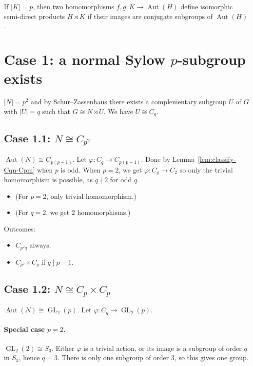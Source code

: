 \begin{lemma}
    \label{lem:conjugate-image-sdp}
    If $|K| = p$, then two homomorphisms $f, g : K \to \operatorname{Aut}(H)$
    define isomorphic semi-direct products $H \rtimes K$ if their images are
    conjugate subgroups of $\operatorname{Aut}(H)$.
\end{lemma}

\section{Case 1: a normal Sylow $p$-subgroup exists}

$|N| = p^2$ and by Schur--Zassenhaus there exists a complementary subgroup $U$
of $G$ with $|U| = q$ such that $G \cong N \rtimes U$. We have $U \cong C_q$.

\subsection{Case 1.1: $N \cong C_{p^2}$}

$\operatorname{Aut}(N) \cong C_{p(p-1)}$. Let
$\varphi : C_q \to C_{p(p-1)}$. Done by Lemma~\ref{lem:classify-Cqn-Cpm}
when $p$ is odd. When $p = 2$, we get $\varphi : C_q \to C_2$ so only the
trivial homomorphism is possible, as $q \nmid 2$ for odd $q$.

\begin{itemize}
    \item (For $p = 2$, only trivial homomorphism.)
    \item (For $q = 2$, we get $2$ homomorphisms.)
\end{itemize}

Outcomes:
\begin{itemize}
    \item $C_{p^2 q}$ always.
    \item $C_{p^2} \rtimes C_q$ if $q \mid p - 1$.
\end{itemize}

\subsection{Case 1.2: $N \cong C_p \times C_p$}

$\operatorname{Aut}(N) \cong \operatorname{GL}_2(p)$. Let
$\varphi : C_q \to \operatorname{GL}_2(p)$.

\paragraph{Special case $p = 2$.}
$\operatorname{GL}_2(2) \cong S_3$. Either $\varphi$ is a trivial action, or
its image is a subgroup of order $q$ in $S_3$, hence $q = 3$. There is only
one subgroup of order $3$, so this gives one group.

